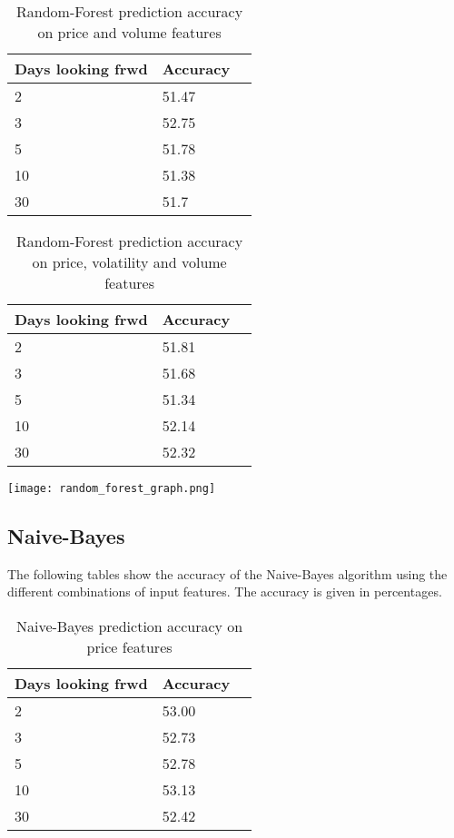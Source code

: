 \documentclass{article}
\begin{document}
\begin{table}[h]
\begin{center}
    \begin{tabular}{ | l | l | p{3cm} |}
    \hline
    Days looking frwd & Accuracy \\ \hline
    2 & 51.47  \\ \hline
    3 & 52.75  \\ \hline
    5 & 51.78  \\ \hline
    10 & 51.38  \\ \hline
    30 & 51.7 \\ 
    \hline
    \end{tabular}
\caption{Random-Forest prediction accuracy on price and volume features}
\end{center}
\end{table}

\begin{table}[!h]
\begin{center}
    \begin{tabular}{ | l | l | p{3cm} |}
    \hline
    Days looking frwd & Accuracy \\ \hline
    2 & 51.81  \\ \hline
    3 & 51.68  \\ \hline
    5 & 51.34  \\ \hline
    10 & 52.14  \\ \hline
    30 & 52.32 \\ 
    \hline
    \end{tabular}
\caption{Random-Forest prediction accuracy on price, volatility and volume features}
\end{center}
\end{table}
\texttt{[image: random\_forest\_graph.png]}

\newpage
\subsection{Naive-Bayes}
The following tables show the accuracy of the Naive-Bayes algorithm using the different combinations of input features. The accuracy is given in percentages.
\begin{table}[!h]
\begin{center}
    \begin{tabular}{ | l | l | p{3cm} |}
    \hline
    Days looking frwd & Accuracy \\ \hline
    2 & 53.00  \\ \hline
    3 & 52.73  \\ \hline
    5 & 52.78  \\ \hline
    10 & 53.13  \\ \hline
    30 & 52.42 \\ 
    \hline
    \end{tabular}
\caption{Naive-Bayes prediction accuracy on price features}
\end{center}
\end{table}
\end{document}
